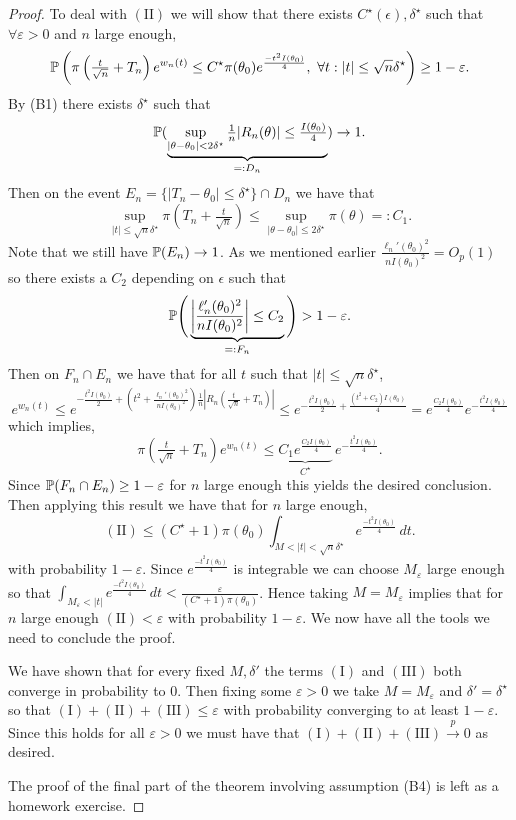\begin{proof}
  	\bigskip \noindent To deal with $(\text{II})$ we will show that there exists $C^\star(\epsilon), \delta^\star$ such that $\forall \varepsilon > 0$ and $n$ large enough, \[
  		\mathbb{P}\left(\pi\left(\tfrac{t}{\sqrt{n}} + T_n \right) e^{w_n(t)} \leq C^\star \pi(\theta_0) e^{\frac{-t^2 I(\theta_0)}{4}}, \ \forall t : |t| \leq \sqrt{n}\delta^\star \right) \geq 1 - \varepsilon.
  	\] By (B1) there exists $\delta^\star$ such that \[
  	\mathbb{P}(\underbrace{\sup_{|\theta - \theta_0| < 2\delta^\star} \tfrac{1}{n} |R_n(\theta)| \le \tfrac{I(\theta_0)}{4}}_{=: D_n}) \to 1.
  	\] Then on the event $E_n = \{|T_n - \theta_0| \leq \delta^\star\} \cap D_n$ we have that \[
  		\sup_{|t| \leq \sqrt{n} \delta^\star} \pi(T_n + \tfrac{t}{\sqrt{n}}) \leq \sup_{|\theta - \theta_0| \leq 2\delta^\star} \pi(\theta) =: C_1.
  	\] Note that we still have $\mathbb{P}(E_n) \to 1$. As we mentioned earlier $\frac{\ell_n'(\theta_0)^2}{nI(\theta_0)^2} = O_p(1)$ so there exists a $C_2$ depending on $\epsilon$ such that \[
  		\mathbb{P}\Bigg(\underbrace{\left|\frac{\ell_n'(\theta_0)^2}{nI(\theta_0)^2}\right| \leq C_2}_{=: F_n}\Bigg) > 1 - \varepsilon.
  	\]
  	Then on $F_n \cap E_n$ we have that for all $t$ such that $|t| \leq \sqrt{n}\delta^\star$, \[
  		e^{w_n(t)} \leq e^{- \frac{t^2 I(\theta_0)}{2} + \left(t^2 + \frac{\ell_n'(\theta_0)^2}{nI(\theta_0)^2}\right) \tfrac{1}{n}\left|R_n\left(\tfrac{t}{\sqrt{n}} + T_n\right)\right|} \leq e^{- \frac{t^2 I(\theta_0)}{2} + \frac{(t^2 + C_2)I(\theta_0) }{4}} = e^{\frac{C_2 I(\theta_0)}{4}} e^{- \frac{t^2 I(\theta_0)}{4}} 
  	\] which implies, \[
  		\pi\left(\tfrac{t}{\sqrt{n}} + T_n \right) e^{w_n(t)} \leq \underbrace{C_1 e^{\frac{C_2 I(\theta_0)}{4}}}_{C^\star} \, e^{- \frac{t^2 I(\theta_0)}{4}}. 
  	\] Since $\mathbb{P}(F_n \cap E_n) \geq 1 - \varepsilon$ for $n$ large enough this yields the desired conclusion. Then applying this result we have that for $n$ large enough, \[
  		(\text{II})
  		\leq (C^\star +1)\pi(\theta_0) \int_{M < |t| < \sqrt{n}\delta^\star } e^{\frac{-t^2 I(\theta_0)}{4}} \, dt.
  	\] with probability $1 - \varepsilon$. Since $e^{\frac{-t^2 I(\theta_0)}{4}}$ is integrable we can choose $M_\varepsilon$ large enough so that $ \int_{M_\varepsilon < |t|} e^{\frac{-t^2 I(\theta_0)}{4}} \, dt < \frac{\varepsilon}{(C^\star +1)\pi(\theta_0)}$. Hence taking $M = M_\varepsilon$ implies that for $n$ large enough $(\text{II}) < \varepsilon$ with probability $1 - \varepsilon$. We now have all the tools we need to conclude the proof. 
  	
  	\bigskip \noindent We have shown that for every fixed $M, \delta'$ the terms $(\text{I})$ and $(\text{III})$ both converge in probability to $0$. Then fixing some $\varepsilon > 0$ we take $M = M_\varepsilon$ and $\delta' = \delta^\star$ so that $(\text{I})+(\text{II})+(\text{III}) \leq \varepsilon$ with probability converging to at least $1 - \varepsilon$. Since this holds for all $\varepsilon > 0$ we must have that $(\text{I})+(\text{II})+(\text{III}) \overset{p}{\to} 0$ as desired.
  	
  	\bigskip \noindent The proof of the final part of the theorem involving assumption (B4) is left as a homework exercise.
\end{proof}

